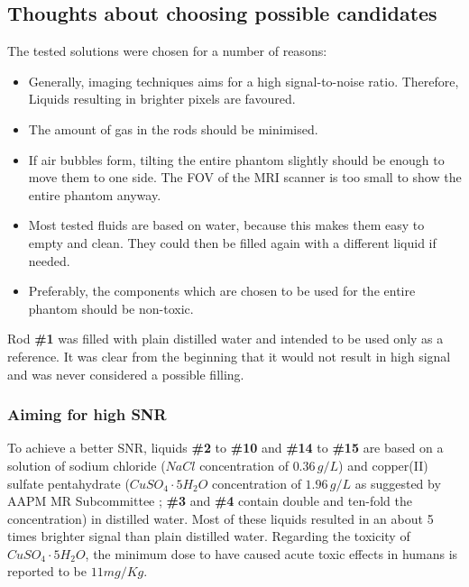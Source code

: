 \subsection{Thoughts about choosing possible candidates}

The tested solutions were chosen for a number of reasons:
\begin{itemize}
\item Generally, imaging techniques aims for a high signal-to-noise ratio. Therefore, Liquids resulting in brighter pixels are favoured.
\item The amount of gas in the rods should be minimised.
\item If air bubbles form, tilting the entire phantom slightly should be enough to move them to one side. The FOV of the MRI scanner is too small to show the entire phantom anyway.
\item Most tested fluids are based on water, because this makes them easy to empty and clean.
They could then be filled again with a different liquid if needed.
\item Preferably, the components which are chosen to be used for the entire phantom should be non-toxic.
\end{itemize}

\vspace{1cm}

Rod \textbf{\#1} was filled with plain distilled water and intended to be used only as a reference.
It was clear from the beginning that it would not result in high signal and was never considered a possible filling.

\subsubsection{Aiming for high SNR}
To achieve a better SNR, liquids \textbf{\#2} to \textbf{\#10} and \textbf{\#14} to \textbf{\#15} are based on a solution of sodium chloride ($NaCl$ concentration of $0.36 \, g/L$) and copper(II) sulfate pentahydrate ($CuSO_4\cdot5H_2O$ concentration of $1.96 \, g/L$ as suggested by AAPM MR Subcommittee \cite{Jackson2009};  \textbf{\#3} and \textbf{\#4} contain double and ten-fold the concentration) in distilled water.
Most of these liquids resulted in an about 5 times brighter signal than plain distilled water.
Regarding the toxicity of $CuSO_4\cdot5H_2O$, the minimum dose to have caused acute toxic effects in humans is reported to be $11 mg/Kg$.

